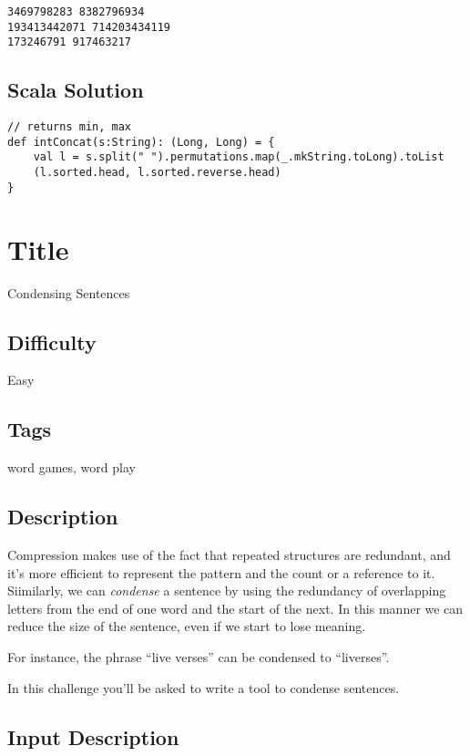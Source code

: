 \begin{verbatim}
3469798283 8382796934
193413442071 714203434119
173246791 917463217
\end{verbatim}

\subsection{Scala Solution}\label{scala-solution-14}

\begin{verbatim}
// returns min, max
def intConcat(s:String): (Long, Long) = {
    val l = s.split(" ").permutations.map(_.mkString.toLong).toList
    (l.sorted.head, l.sorted.reverse.head)
}
\end{verbatim}

\section{Title}\label{title-21}

Condensing Sentences

\subsection{Difficulty}\label{difficulty-20}

Easy

\subsection{Tags}\label{tags-21}

word games, word play

\subsection{Description}\label{description-21}

Compression makes use of the fact that repeated structures are
redundant, and it's more efficient to represent the pattern and the
count or a reference to it. Siimilarly, we can \emph{condense} a
sentence by using the redundancy of overlapping letters from the end of
one word and the start of the next. In this manner we can reduce the
size of the sentence, even if we start to lose meaning.

For instance, the phrase ``live verses'' can be condensed to
``liverses''.

In this challenge you'll be asked to write a tool to condense sentences.

\subsection{Input Description}\label{input-description-14}


